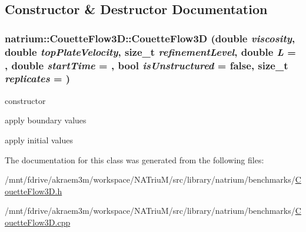 \subsection{Constructor \& Destructor Documentation}
\hypertarget{classnatrium_1_1CouetteFlow3D_a8b290b81061a030b5984377c48b3f2cc}{
\subsubsection[{CouetteFlow3D}]{\setlength{\rightskip}{0pt plus 5cm}natrium::CouetteFlow3D::CouetteFlow3D (double {\em viscosity}, \/  double {\em topPlateVelocity}, \/  size\_\-t {\em refinementLevel}, \/  double {\em L} = {}, \/  double {\em startTime} = {}, \/  bool {\em isUnstructured} = {\ttfamily false}, \/  size\_\-t {\em replicates} = {})}}
\label{classnatrium_1_1CouetteFlow3D_a8b290b81061a030b5984377c48b3f2cc}


constructor 

apply boundary values

apply initial values 

The documentation for this class was generated from the following files:\begin{DoxyCompactItemize}
\item 
/mnt/fdrive/akraem3m/workspace/NATriuM/src/library/natrium/benchmarks/\hyperlink{CouetteFlow3D_8h}{CouetteFlow3D.h}\item 
/mnt/fdrive/akraem3m/workspace/NATriuM/src/library/natrium/benchmarks/\hyperlink{CouetteFlow3D_8cpp}{CouetteFlow3D.cpp}\end{DoxyCompactItemize}
